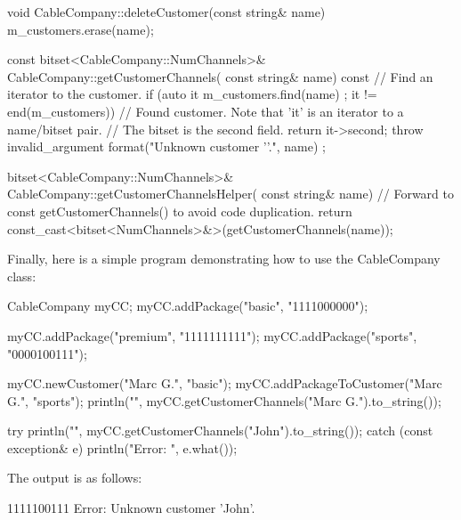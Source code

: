 \begin{cpp}
void CableCompany::deleteCustomer(const string& name)
{
    m_customers.erase(name);
}

const bitset<CableCompany::NumChannels>& CableCompany::getCustomerChannels(
    const string& name) const
{
    // Find an iterator to the customer.
    if (auto it { m_customers.find(name) }; it != end(m_customers)) {
        // Found customer. Note that 'it' is an iterator to a name/bitset pair.
        // The bitset is the second field.
        return it->second;
    }
    throw invalid_argument { format("Unknown customer '{}'.", name) };
}

bitset<CableCompany::NumChannels>& CableCompany::getCustomerChannelsHelper(
    const string& name)
{
    // Forward to const getCustomerChannels() to avoid code duplication.
    return const_cast<bitset<NumChannels>&>(getCustomerChannels(name));
}
\end{cpp}

Finally, here is a simple program demonstrating how to use the CableCompany class:

\begin{cpp}
CableCompany myCC;
myCC.addPackage("basic", "1111000000");

myCC.addPackage("premium", "1111111111");
myCC.addPackage("sports", "0000100111");

myCC.newCustomer("Marc G.", "basic");
myCC.addPackageToCustomer("Marc G.", "sports");
println("{}", myCC.getCustomerChannels("Marc G.").to_string());

try { println("{}", myCC.getCustomerChannels("John").to_string()); }
catch (const exception& e) { println("Error: {}", e.what()); }
\end{cpp}

The output is as follows:

\begin{shell}
1111100111
Error: Unknown customer 'John'.
\end{shell}






